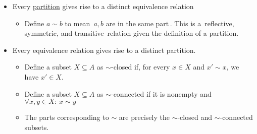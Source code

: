 \begin{itemize}
    \item Every \href{doc/1 math/Seven Sketches in Compositionality/1 Generative Effects/2 What is order/Partition}{partition} gives rise to a distinct equivalence relation
          \begin{itemize} \item Define $a \sim b$ to mean \,$a,b$ are in the same part\,. This is a \,reflective, symmetric, and transitive\, relation given the definition of a partition.\end{itemize}
    \item Every equivalence relation gives rise to a distinct partition.
    \begin{itemize}
      \item Define a subset $X \subseteq A$ as $\sim$-closed if, for every $x \in X$ and $x' \sim x$, we have $x' \in X$.
    \item Define a subset $X \subseteq A$ as $\sim$-connected if it is nonempty and $\forall x,y \in X:\ x \sim y$
    \item The parts corresponding to $\sim$ are precisely the $\sim$-closed and $\sim$-connected subsets.
  \end{itemize}
\end{itemize}
